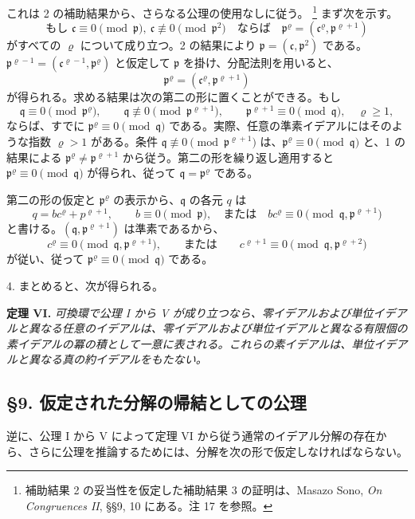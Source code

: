 \documentclass[11pt]{article}
\providecommand{\mc}{\mathfrak{c}}
\providecommand{\mpideal}{\mathfrak{p}}
\providecommand{\mq}{\mathfrak{q}}
\begin{document}
これは 2 の補助結果から、さらなる公理の使用なしに従う。
\footnote{補助結果 2 の妥当性を仮定した補助結果 3 の証明は、Masazo Sono, \emph{On Congruences II}, §§9, 10 にある。注 17 を参照。}
まず次を示す。
\[
        \text{もし }\mc\equiv0\pmod{\mpideal},\ \mc\not\equiv0\pmod{\mpideal^2}
        \quad\text{ならば}\quad
        \mpideal^\varrho=(\mc^\varrho,\mpideal^{\varrho+1})
\]
がすべての $\varrho$ について成り立つ。2 の結果により $\mpideal=(\mc,\mpideal^2)$ である。$\mpideal^{\varrho-1}=(\mc^{\varrho-1},\mpideal^\varrho)$ と仮定して $\mpideal$ を掛け、分配法則を用いると、
\[
        \mpideal^\varrho=(\mc^\varrho,\mpideal^{\varrho+1})
\]
が得られる。求める結果は次の第二の形に置くことができる。もし
\[
        \mq\equiv0\pmod{\mpideal^\varrho},
        \qquad \mq\not\equiv0\pmod{\mpideal^{\varrho+1}},
        \qquad \mpideal^{\varrho+1}\equiv0\pmod{\mq},
        \quad \varrho\ge1,
\]
ならば、すでに $\mpideal^\varrho\equiv0\pmod{\mq}$ である。実際、任意の準素イデアルにはそのような指数 $\varrho>1$ がある。条件 $\mq\not\equiv0\pmod{\mpideal^{\varrho+1}}$ は、$\mpideal^\varrho\equiv0\pmod{\mq}$ と、1 の結果による $\mpideal^\varrho\ne\mpideal^{\varrho+1}$ から従う。第二の形を繰り返し適用すると $\mpideal^\varrho\equiv0\pmod{\mq}$ が得られ、従って $\mq=\mpideal^\varrho$ である。

第二の形の仮定と $\mpideal^\varrho$ の表示から、$\mq$ の各元 $q$ は
\[
        q=b c^\varrho+p^{\varrho+1},
        \qquad b\equiv0\pmod{\mpideal},
        \quad\text{または}\quad b c^\varrho\equiv0\pmod{\mq,\mpideal^{\varrho+1}}
\]
と書ける。$(\mq,\mpideal^{\varrho+1})$ は準素であるから、
\[
        c^\varrho\equiv0\pmod{\mq,\mpideal^{\varrho+1}},
        \qquad\text{または}\qquad
        c^{\varrho+1}\equiv0\pmod{\mq,\mpideal^{\varrho+2}}
\]
が従い、従って $\mpideal^\varrho\equiv0\pmod{\mq}$ である。

4. まとめると、次が得られる。

\textbf{定理 VI.} \emph{可換環で公理 I から V が成り立つなら、零イデアルおよび単位イデアルと異なる任意のイデアルは、零イデアルおよび単位イデアルと異なる有限個の素イデアルの冪の積として一意に表される。これらの素イデアルは、単位イデアルと異なる真の約イデアルをもたない。}

\subsection*{§9. 仮定された分解の帰結としての公理}

逆に、公理 I から V によって定理 VI から従う通常のイデアル分解の存在から、さらに公理を推論するためには、分解を次の形で仮定しなければならない。
\end{document}
